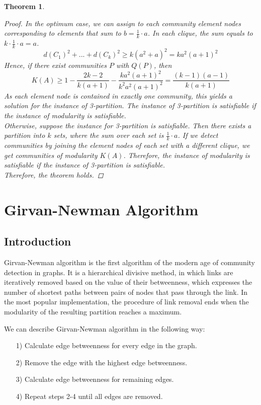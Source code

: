\documentclass[11pt]{article}
\newtheorem{theorem}{Theorem}
\begin{document}
\begin{theorem}
\begin{proof}
    In the optimum case, we can assign to each community element nodes corresponding to elements that sum to $b=\frac{1}{k}·a$. In each clique, the sum equals to $k·\frac{1}{k}·a=a$. 
    \begin{equation}
      d(C_1)^2+...+d(C_k)^2\ge k(a^2+a)^2 = ka^2(a+1)^2
    \end{equation}
    Hence, if there exist communities $P$ with $Q(P)$, then 
    \begin{equation}
      K(A)\ge 1-\frac{2k-2}{k(a+1)}-\frac{ka^2(a+1)^2}{k^2a^2(a+1)^2} = \frac{(k-1)(a-1)}{k(a+1)}
    \end{equation}
    As each element node is contained in exactly one community, this yields a solution for the instance of 3-partition. The instance of 3-partition is satisfiable if the instance of modularity is satisfiable.
    \\Otherwise, suppose the instance for 3-partition is satisfiable. Then there exists a partition into $k$ sets, where the sum over each set is $\frac{1}{k}·a$. If we detect communities by joining the element nodes of each set with a different clique, we get communities of modularity $K(A)$. Therefore, the instance of modularity is satisfiable if the instance of 3-partition is satisfiable.
    \\Therefore, the theorem holds.
  \end{proof}
\end{theorem}


\section{Girvan-Newman Algorithm}

\subsection{Introduction}

Girvan-Newman algorithm is the first algorithm of the modern age of community detection in graphs.\cite{newman2006} 
It is a hierarchical divisive method, in which links are iteratively removed based on the value of their betweenness, which expresses the number of shortest paths between pairs of nodes that pass through the link. 
In the most popular implementation, the procedure of link removal ends when the modularity of the resulting partition reaches a maximum.

\linespread{1.25}\selectfont
We can describe Girvan-Newman algorithm in the following way:
\begin{itemize}
  \setlength{\topsep}{0pt}
  \setlength{\itemsep}{1.25pt}
  \setlength{\parsep}{1.25pt}
  \setlength{\parskip}{1.25pt}
  \item [1)] Calculate edge betweenness for every edge in the graph.
  \item [2)] Remove the edge with the highest edge betweenness.
  \item [3)] Calculate edge betweenness for remaining edges.
  \item [4)] Repeat steps 2-4 until all edges are removed.
\end{itemize}
\end{document}
